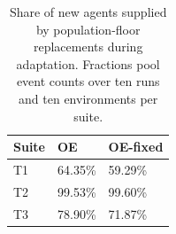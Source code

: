 \begin{table}[tb]
\centering\small
\caption{Share of new agents supplied by population-floor replacements during adaptation. Fractions pool event counts over ten runs and ten environments per suite.}\label{tab:floor}
\begin{tabularx}{\linewidth}{lYY}
\toprule
Suite & OE & OE-fixed\\\midrule
T1 & 64.35\% & 59.29\%\\
T2 & 99.53\% & 99.60\%\\
T3 & 78.90\% & 71.87\%\\
\bottomrule
\end{tabularx}
\end{table}

